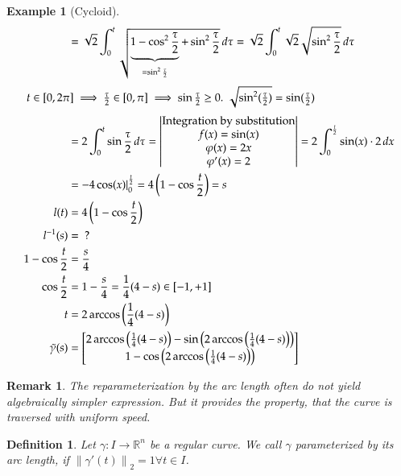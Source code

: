 \documentclass{article}
\newtheorem{example}{Example}  \numberwithin{example}{section}
\newtheorem{definition}{Definition}  \numberwithin{definition}{section}
\newtheorem{remark}{Remark}  \numberwithin{remark}{section}
\newcommand{\norm}[1]{\left\|#1\right\|}
\begin{document}
\begin{example}[Cycloid]
\begin{align*}
      &= \sqrt{2} \int_0^t \sqrt{\underbrace{1 - \cos^2{\frac\tau2}}_{= \sin^2{\frac\tau2}} + \sin^2{\frac\tau2}} \, d\tau
      = \sqrt{2} \int_0^t \sqrt{2} \sqrt{\sin^2{\frac\tau2}} \, d\tau \\
    \intertext{
      $t \in [0, 2\pi] \implies \frac\tau2 \in [0, \pi] \implies \sin\frac\tau2 \geq 0$.
      $\sqrt{\sin^2(\frac\tau2)} = \sin(\frac\tau2)$
    }
      &= 2 \int_0^t \sin{\frac\tau2} \, d\tau = \begin{vmatrix} \text{Integration by substitution} \\ f(x) = \sin(x) \\ \varphi(x) = 2x \\ \varphi'(x) = 2 \end{vmatrix} = 2 \int_0^{\frac t2} \sin(x) \cdot 2 \, dx \\
      &= -4 \cos(x) |_0^{\frac t2} = 4 \left(1 - \cos\frac t2\right) = s \\
    l(t) &= 4 \left(1 - \cos\frac t2\right) \\
    l^{-1}(s) &= \text{ ?} \\
    1 - \cos\frac t2 &= \frac s4 \\
    \cos\frac t2 &= 1 - \frac s4 = \frac14 (4 - s) \in [-1, +1] \\
    t &= 2 \arccos\left(\frac14 (4 - s)\right) \\
    \tilde \gamma(s) &= \begin{bmatrix}
      2 \arccos\left(\frac14 (4 - s)\right) - \sin\left(2 \arccos\left(\frac14 (4 - s)\right)\right) \\
      1 - \cos\left(2 \arccos\left(\frac14(4 - s)\right)\right)
    \end{bmatrix}
  \end{align*}
\end{example}

\begin{remark}
  The reparameterization by the arc length often do not yield algebraically simpler expression.
  But it provides the property, that the curve is traversed with uniform speed.
\end{remark}

\begin{definition} %
  Let $\gamma: I \to \mathbb R^n$ be a regular curve.
  We call $\gamma$ \emph{parameterized by its arc length}, if $\norm{\gamma'(t)}_2 = 1 \forall t \in I$.
\end{definition}
\end{document}

